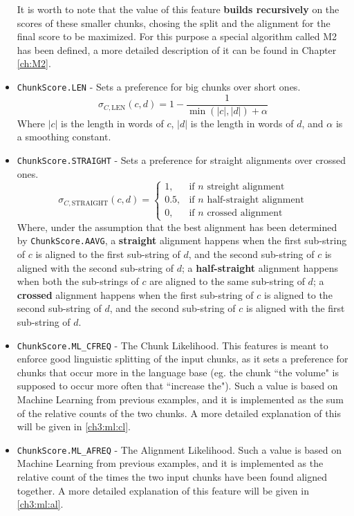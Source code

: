 \begin{itemize}
	It is worth to note that the value of this feature \textbf{builds recursively} on the scores of these smaller chunks, chosing the split and the alignment for the final score to be maximized. For this purpose a special algorithm called M2 has been defined, a more detailed description of it can be found in Chapter \ref{ch:M2}.
	
	\item \texttt{ChunkScore.LEN} - Sets a preference for big chunks over short ones.
	\begin{displaymath}
		\sigma_{C,\text{LEN}}(c,d) = 1-\frac{1}{\min(|c|,|d|)+\alpha}
	\end{displaymath}
	Where $|c|$ is the length in words of $c$, $|d|$ is the length in words of $d$, and $\alpha$ is a smoothing constant.
	
	\item \texttt{ChunkScore.STRAIGHT} - Sets a preference for straight alignments over crossed ones.
	\begin{displaymath}
		\sigma_{C,\text{STRAIGHT}}(c,d) = \begin{cases} 1, & \mbox{if } n\mbox{ streight alignment} \\
		                                                0.5, & \mbox{if } n\mbox{ half-straight alignment} \\
		                                                0, & \mbox{if } n\mbox{ crossed alignment} \end{cases}
	\end{displaymath}
	Where, under the assumption that the best alignment has been determined by \texttt{ChunkScore.AAVG}, a \textbf{straight} alignment happens when the first sub-string of $c$ is aligned to the first sub-string of $d$, and the second sub-string of $c$ is aligned with the second sub-string of $d$; a \textbf{half-straight} alignment happens when both the sub-strings of $c$ are aligned to the same sub-string of $d$; a \textbf{crossed} alignment happens when the first sub-string of $c$ is aligned to the second sub-string of $d$, and the second sub-string of $c$ is aligned with the first sub-string of $d$.

	\item \texttt{ChunkScore.ML\_CFREQ} - The Chunk Likelihood. This features is meant to enforce good linguistic splitting of the input chunks, as it sets a preference for chunks that occur more in the language base (eg. the chunk ``the volume" is supposed to occur more often that ``increase the"). Such a value is based on Machine Learning from previous examples, and it is implemented as the sum of the relative counts of the two chunks. A more detailed explanation of this will be given in \ref{ch3:ml:cl}.

	\item \texttt{ChunkScore.ML\_AFREQ} - The Alignment Likelihood. Such a value is based on Machine Learning from previous examples, and it is implemented as the relative count of the times the two input chunks have been found aligned together. A more detailed explanation of this feature will be given in  \ref{ch3:ml:al}. 
\end{itemize}

